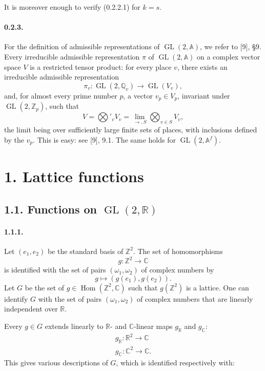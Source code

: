 \documentclass[10pt,a4paper]{article}
\providecommand{\GL}{\operatorname{GL}}
\providecommand{\Hom}{\operatorname{Hom}}
\providecommand{\R}{\mathbb R}
\providecommand{\Q}{\mathbb Q}
\providecommand{\Z}{\mathbb Z}
\providecommand{\C}{\mathbb C}
\providecommand{\A}{\mathbb A}
\begin{document}
\clearpage
{}
\hypertarget{authority-8}{}
It is moreover enough to verify (0.2.2.1) for $k=s$.

\paragraph{0.2.3.} For the definition of admissible representations of $\GL(2,\A)$, we refer to [9], §9. Every irreducible admissible representation $\pi$ of $\GL(2,\A)$ on a complex vector space $V$ is a restricted tensor product: for every place $v$, there exists an irreducible admissible representation
\[
\pi_v:\GL(2,\Q_v)\longrightarrow\GL(V_v),
\]
and, for almost every prime number $p$, a vector $v_p\in V_p$, invariant under $\GL(2,\Z_p)$, such that
\[
V=\mathop{\bigotimes}\nolimits'_v V_v=\lim_{\longrightarrow,S}\bigotimes_{v\in S}V_v,
\]
the limit being over sufficiently large finite sets of places, with inclusions defined by the $v_p$. This is easy: see [9], 9.1. The same holds for $\GL(2,\A^f)$.

\section*{1. Lattice functions}

\subsection*{1.1. Functions on $\GL(2,\R)$}

\paragraph{1.1.1.} Let $(e_1,e_2)$ be the standard basis of $\Z^2$. The set of homomorphisms
\[
g:\Z^2\longrightarrow\C
\]
is identified with the set of pairs $(\omega_1,\omega_2)$ of complex numbers by
\[
g\longmapsto(g(e_1),g(e_2)).
\]
Let $G$ be the set of $g\in\Hom(\Z^2,\C)$ such that $g(\Z^2)$ is a lattice. One can identify $G$ with the set of pairs $(\omega_1,\omega_2)$ of complex numbers that are linearly independent over $\R$.

Every $g\in G$ extends linearly to $\R$- and $\C$-linear maps $g_{\R}$ and $g_{\C}$:
\[
\begin{gathered}
g_{\R}:\R^2\longrightarrow\C\\
g_{\C}:\C^2\longrightarrow\C.
\end{gathered}
\]
This gives various descriptions of $G$, which is identified respectively with:
\end{document}
